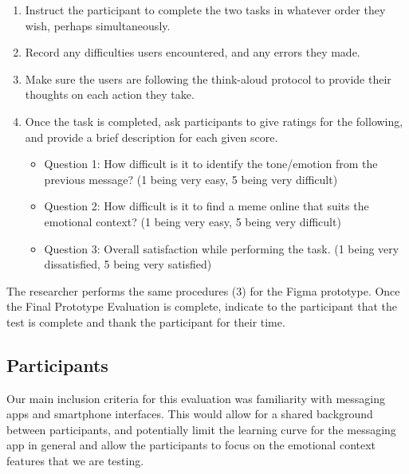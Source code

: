 \documentclass[acmsmall,screen,authorversion,nonacm]{acmart}
\begin{document}
\begin{enumerate}
    \item Instruct the participant to complete the two tasks in whatever order they wish, perhaps simultaneously.
    \item Record any difficulties users encountered, and any errors they made.
    \item Make sure the users are following the think-aloud protocol to provide their thoughts on each action they take.
    \item Once the task is completed, ask participants to give ratings for the following, and provide a brief description for each given score.
        \begin{itemize}
            \item Question 1: How difficult is it to identify the tone/emotion from the previous message? (1 being very easy, 5 being very difficult)
            \item Question 2: How difficult is it to find a meme online that suits the emotional context? (1 being very easy, 5 being very difficult)
            \item Question 3: Overall satisfaction while performing the task. (1 being very dissatisfied, 5 being very satisfied)
        \end{itemize}
\end{enumerate}

The researcher performs the same procedures (3) for the Figma prototype. Once the Final Prototype Evaluation is complete, indicate to the participant that the test is complete and thank the participant for their time.


\subsection{Participants}
Our main inclusion criteria for this evaluation was familiarity with messaging apps and smartphone interfaces. This would allow for a shared background between participants, and potentially limit the learning curve for the messaging app in general and allow the participants to focus on the emotional context features that we are testing. 
\end{document}
